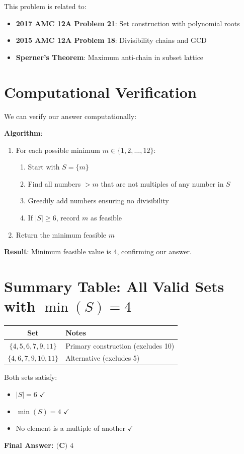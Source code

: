 \documentclass[12pt]{article}
\begin{document}
This problem is related to:
\begin{itemize}
    \item \textbf{2017 AMC 12A Problem 21}: Set construction with polynomial roots
    \item \textbf{2015 AMC 12A Problem 18}: Divisibility chains and GCD
    \item \textbf{Sperner's Theorem}: Maximum anti-chain in subset lattice
\end{itemize}

\section*{Computational Verification}

We can verify our answer computationally:

\textbf{Algorithm}:
\begin{enumerate}
    \item For each possible minimum $m \in \{1,2,\ldots,12\}$:
    \begin{enumerate}
        \item Start with $S = \{m\}$
        \item Find all numbers $> m$ that are not multiples of any number in $S$
        \item Greedily add numbers ensuring no divisibility
        \item If $|S| \geq 6$, record $m$ as feasible
    \end{enumerate}
    \item Return the minimum feasible $m$
\end{enumerate}

\textbf{Result}: Minimum feasible value is 4, confirming our answer.

\section*{Summary Table: All Valid Sets with $\min(S) = 4$}

\begin{center}
\begin{tabular}{|c|l|}
\hline
\textbf{Set} & \textbf{Notes} \\
\hline
$\{4,5,6,7,9,11\}$ & Primary construction (excludes 10) \\
$\{4,6,7,9,10,11\}$ & Alternative (excludes 5) \\
\hline
\end{tabular}
\end{center}

Both sets satisfy:
\begin{itemize}
    \item $|S| = 6$ $\checkmark$
    \item $\min(S) = 4$ $\checkmark$
    \item No element is a multiple of another $\checkmark$
\end{itemize}

\vspace{1cm}

\begin{center}
\Large\textbf{Final Answer: $\boxed{\textbf{(C) } 4}$}
\end{center}
\end{document}
